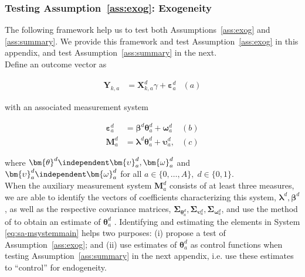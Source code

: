 \subsubsection{Testing Assumption~\ref{ass:exog}: Exogeneity} \label{app:endogeneity}

\noindent The following framework help us to test both Assumptions~\ref{ass:exog} and \ref{ass:summary}. We provide this framework and test Assumption~\ref{ass:exog} in this appendix, and test Assumption~\ref{ass:summary} in the next.\\

\noindent Define an outcome vector as 

\begin{align}
\bm{Y}_{k,a} &= \bm{X}^d_{k,a} \gamma + \bm{\varepsilon}^d_a  &(a) \nonumber
\end{align}

\noindent with an associated measurement system 

\begin{align}  \label{eq:sa-msystemmain}
\bm{\varepsilon}_{a}^d &=\bm{\beta}^d \bm{\theta}_{a}^d + \bm{\omega}_{a}^d  &(b) \nonumber \\
\bm{M}_{a}^d &= \bm{\lambda}^d \bm{\theta}_{a}^d + \bm{\upsilon}_a^d,  &(c)
\end{align}


\noindent where $\bm{\theta}^d \independent \bm{\upsilon}_{a}^d, \bm{\omega}_{a}^d$ and $\bm{\upsilon}_{a}^d \independent \bm{\omega}_{a}^d$ for all $a \in \{0, \ldots, A \}, \; d \in \{0,1\}$.\\


\noindent When the auxiliary measurement system $\bm{M}_{a}^d $ consists of at least three measures, we are able to identify the vectors of coefficients characterizing this system, $\bm{\lambda}^d, \bm{\beta}^d$, as well as the respective covariance matrices, $\bm{\Sigma}_{\bm{\theta}_{a}^d}, \bm{\Sigma}_{\bm{\upsilon}_{a}^d}, \bm{\Sigma}_{\bm{\omega}_{a}^d}$, and use the method of \citet{Bartlett_1938_Nature} to obtain an estimate of $\bm{\theta}_{a}^d$ \citep{Heckman_Pinto_etal_2013_PerryFactor}. Identifying and estimating the elements in System \eqref{eq:sa-msystemmain} helps two purposes: (i) propose a test of Assumption~\ref{ass:exog}; and (ii) use estimates of $\bm{\theta}_{a}^d$ as control functions when testing Assumption~\ref{ass:summary} in the next appendix, i.e. use these estimates to ``control'' for endogeneity.\\

